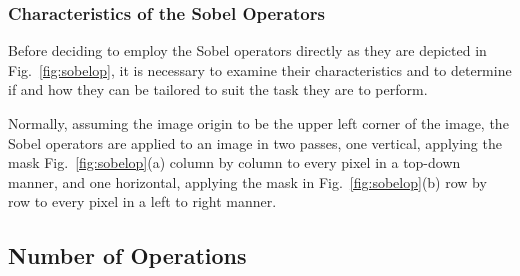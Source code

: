 \subsubsection{Characteristics of the Sobel Operators}

Before deciding to employ the Sobel operators directly as they are
depicted in Fig.~\ref{fig:sobelop}, it is necessary to examine their
characteristics and to determine if and how they can be tailored to
suit the task they are to perform.

Normally, assuming the image origin to be the upper left corner of the
image, the Sobel operators are applied to an image in two passes, one
vertical, applying the mask Fig.~\ref{fig:sobelop}(a) column by column
to every pixel in a top-down manner, and one horizontal, applying the
mask in Fig.~\ref{fig:sobelop}(b) row by row to every pixel in a left
to right manner.

\subsection{Number of Operations}
\label{algo:pos:O}

